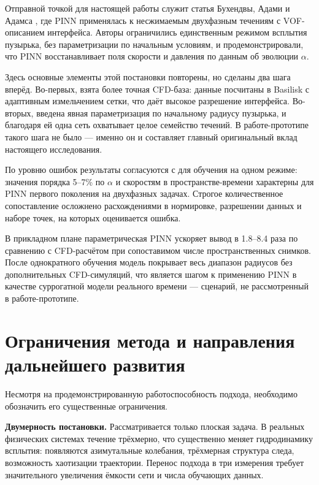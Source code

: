 Отправной точкой для настоящей работы служит статья Бухендвы, Адами и Адамса
\cite{Buhendwa2021}, где PINN применялась к несжимаемым двухфазным течениям с
VOF-описанием интерфейса. Авторы ограничились единственным режимом всплытия
пузырька, без параметризации по начальным условиям, и продемонстрировали, что
PINN восстанавливает поля скорости и давления по данным об эволюции
\(\alpha\).

Здесь основные элементы этой постановки повторены, но сделаны два шага вперёд.
Во-первых, взята более точная CFD-база: данные посчитаны в Basilisk с
адаптивным измельчением сетки, что даёт высокое разрешение интерфейса.
Во-вторых, введена явная параметризация по начальному радиусу пузырька, и
благодаря ей одна сеть охватывает целое семейство течений. В работе-прототипе
такого шага не было --- именно он и составляет главный оригинальный вклад
настоящего исследования.

По уровню ошибок результаты согласуются с \cite{Buhendwa2021} для обучения на
одном режиме: значения порядка 5--7\% по \(\alpha\) и скоростям в
пространстве-времени характерны для PINN первого поколения на двухфазных
задачах. Строгое количественное сопоставление осложнено расхождениями в
нормировке, разрешении данных и наборе точек, на которых оценивается ошибка.

В прикладном плане параметрическая PINN ускоряет вывод в 1.8--8.4 раза по
сравнению с CFD-расчётом при сопоставимом числе пространственных снимков. После однократного обучения модель покрывает весь
диапазон радиусов без дополнительных CFD-симуляций, что является шагом к
применению PINN в качестве суррогатной модели реального времени --- сценарий,
не рассмотренный в работе-прототипе.

\section{Ограничения метода и направления дальнейшего развития}

Несмотря на продемонстрированную работоспособность подхода, необходимо
обозначить его существенные ограничения.

\textbf{Двумерность постановки.} Рассматривается только плоская задача. В
реальных физических системах течение трёхмерно, что существенно меняет
гидродинамику всплытия: появляются азимутальные колебания, трёхмерная структура
следа, возможность хаотизации траектории. Перенос подхода в три измерения
требует значительного увеличения ёмкости сети и числа обучающих данных.

